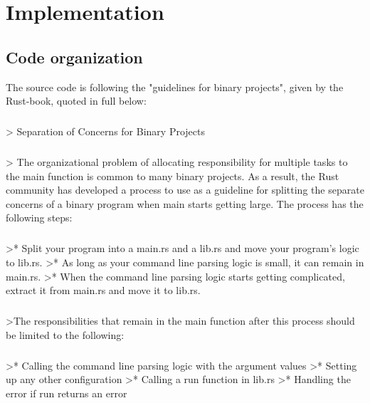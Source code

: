 \chapter{Implementation}

\section{Code organization}

The source code is following the "guidelines for binary projects", given by the Rust-book, quoted in full below:


\paragraph{}
> Separation of Concerns for Binary Projects

\paragraph{}
> The organizational problem of allocating responsibility for multiple tasks to the main function is common to many binary projects. As a result, the Rust community has developed a process to use as a guideline for splitting the separate concerns of a binary program when main starts getting large. The process has the following steps:


\paragraph{}
>* Split your program into a main.rs and a lib.rs and move your program’s logic to lib.rs.
>* As long as your command line parsing logic is small, it can remain in main.rs.
>* When the command line parsing logic starts getting complicated, extract it from main.rs and move it to lib.rs.


\paragraph{}
>The responsibilities that remain in the main function after this process should be limited to the following:


\paragraph{}
>* Calling the command line parsing logic with the argument values
>* Setting up any other configuration
>* Calling a run function in lib.rs
>* Handling the error if run returns an error


